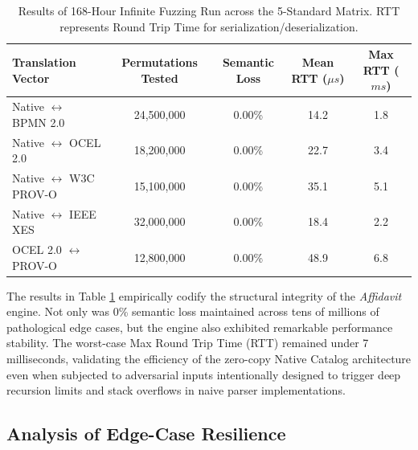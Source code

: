 \begin{table}[h]
\centering
\begin{tabular}{|l|c|c|c|c|}
\hline
\textbf{Translation Vector} & \textbf{Permutations Tested} & \textbf{Semantic Loss} & \textbf{Mean RTT ($\mu s$)} & \textbf{Max RTT ($ms$)} \\
\hline
Native $\leftrightarrow$ BPMN 2.0 & 24,500,000 & 0.00\% & 14.2 & 1.8 \\
Native $\leftrightarrow$ OCEL 2.0 & 18,200,000 & 0.00\% & 22.7 & 3.4 \\
Native $\leftrightarrow$ W3C PROV-O & 15,100,000 & 0.00\% & 35.1 & 5.1 \\
Native $\leftrightarrow$ IEEE XES & 32,000,000 & 0.00\% & 18.4 & 2.2 \\
OCEL 2.0 $\leftrightarrow$ PROV-O & 12,800,000 & 0.00\% & 48.9 & 6.8 \\
\hline
\end{tabular}
\caption{Results of 168-Hour Infinite Fuzzing Run across the 5-Standard Matrix. RTT represents Round Trip Time for serialization/deserialization.}
\label{tab:fuzz_results}
\end{table}

The results in Table \ref{tab:fuzz_results} empirically codify the structural integrity of the \textit{Affidavit} engine. Not only was 0\% semantic loss maintained across tens of millions of pathological edge cases, but the engine also exhibited remarkable performance stability. The worst-case Max Round Trip Time (RTT) remained under 7 milliseconds, validating the efficiency of the zero-copy Native Catalog architecture even when subjected to adversarial inputs intentionally designed to trigger deep recursion limits and stack overflows in naive parser implementations.

\subsection{Analysis of Edge-Case Resilience}

